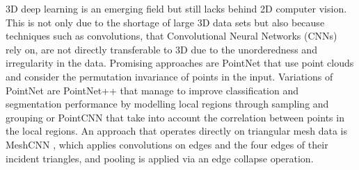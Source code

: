 \documentclass{article}
\begin{document}
3D deep learning is an emerging field but still lacks behind 2D computer vision. This is not only due to the shortage of large 3D data sets but also because techniques such as convolutions, that Convolutional Neural Networks (CNNs) rely on, are not directly transferable to 3D due to the unorderedness and irregularity in the data. Promising approaches are PointNet \cite{Qi2017} that use point clouds and consider the permutation invariance of points in the input. Variations of PointNet are PointNet++ \cite{Qi2017b} that manage to improve classification and segmentation performance by modelling local regions through sampling and grouping or PointCNN \cite{Li2018} that take into account the correlation between points in the local regions.
An approach that operates directly on triangular mesh data is MeshCNN \cite{Hanocka2019}, which applies convolutions on edges and the four edges of their incident triangles, and pooling is applied via an edge collapse operation.
\end{document}
